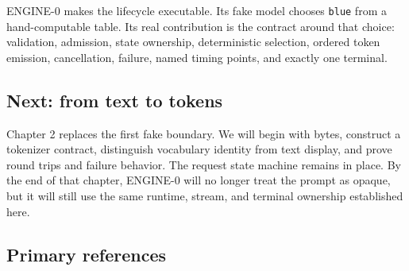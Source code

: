 \documentclass[
  10pt,
]{article}
\begin{document}
ENGINE-0 makes the lifecycle executable. Its fake model chooses
\texttt{blue} from a hand-computable table. Its real contribution is the
contract around that choice: validation, admission, state ownership,
deterministic selection, ordered token emission, cancellation, failure,
named timing points, and exactly one terminal.

\subsection{Next: from text to tokens}\label{next-from-text-to-tokens}

Chapter 2 replaces the first fake boundary. We will begin with bytes,
construct a tokenizer contract, distinguish vocabulary identity from
text display, and prove round trips and failure behavior. The request
state machine remains in place. By the end of that chapter, ENGINE-0
will no longer treat the prompt as opaque, but it will still use the
same runtime, stream, and terminal ownership established here.

\subsection{Primary references}\label{primary-references}
\end{document}
